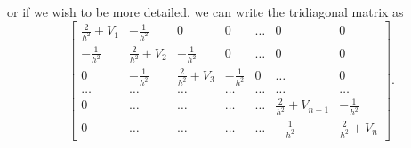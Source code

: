 \documentclass[graybox,envcountchap,sectrefs]{svmult}
\begin{document}
or if we wish to be more detailed, we can write the tridiagonal matrix as
\[
    \begin{bmatrix} \frac{2}{h^2}+V_1 & -\frac{1}{h^2} & 0   & 0    & \dots  &0     & 0 \\
                                -\frac{1}{h^2} & \frac{2}{h^2}+V_2 & -\frac{1}{h^2} & 0    & \dots  &0     &0 \\
                                0   & -\frac{1}{h^2} & \frac{2}{h^2}+V_3 & -\frac{1}{h^2}  &0       &\dots & 0\\
                                \dots  & \dots & \dots & \dots  &\dots      &\dots & \dots\\
                                0   & \dots & \dots & \dots  &\dots       &\frac{2}{h^2}+V_{n-1} & -\frac{1}{h^2}\\
                                0   & \dots & \dots & \dots  &\dots       &-\frac{1}{h^2} & \frac{2}{h^2}+V_{n}
             \end{bmatrix}.
\]
\end{document}
